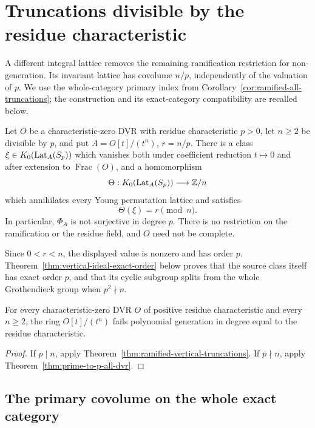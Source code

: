 \section{Truncations divisible by the residue characteristic}
\label{sec:ramified-vertical-truncations}

A different integral lattice removes the remaining ramification
restriction for non-generation.  Its invariant lattice has covolume
\(n/p\), independently of the valuation of \(p\).
We use the whole-category primary index from
Corollary~\ref{cor:ramified-all-truncations}; the construction and
its exact-category compatibility are recalled below.

\begin{theorem}\label{thm:ramified-vertical-truncations}
Let \(O\) be a characteristic-zero DVR with residue characteristic
\(p>0\), let \(n\ge2\) be divisible by \(p\), and put
\(A=O[t]/(t^n)\), \(r=n/p\).
There is a class \(\xi\in K_0(\operatorname{Lat}_A(S_p))\) which vanishes both
under coefficient reduction \(t\mapsto0\) and after extension to
\(\operatorname{Frac}(O)\), and a homomorphism
\[
 \Theta:K_0(\operatorname{Lat}_A(S_p))\longrightarrow\mathbb Z/n
\]
which annihilates every Young permutation lattice and satisfies
\[
 \Theta(\xi)=r\pmod n.
\]
In particular, \(\Phi_A\) is not surjective in degree \(p\).
There is no restriction on the ramification or the residue field,
and \(O\) need not be complete.
\end{theorem}

Since \(0<r<n\), the displayed value is nonzero and has order \(p\).
Theorem~\ref{thm:vertical-ideal-exact-order} below proves that the
source class itself has exact order \(p\), and that its cyclic
subgroup splits from the whole Grothendieck group when \(p^2\nmid n\).

\begin{corollary}\label{cor:all-dvr-truncations-negative}
For every characteristic-zero DVR \(O\) of positive residue
characteristic and every \(n\ge2\), the ring \(O[t]/(t^n)\)
fails polynomial generation in degree equal to the residue
characteristic.
\end{corollary}

\begin{proof}
If \(p\mid n\), apply
Theorem~\ref{thm:ramified-vertical-truncations}.
If \(p\nmid n\), apply Theorem~\ref{thm:prime-to-p-all-dvr}.
\end{proof}

\subsection{The primary covolume on the whole exact category}

